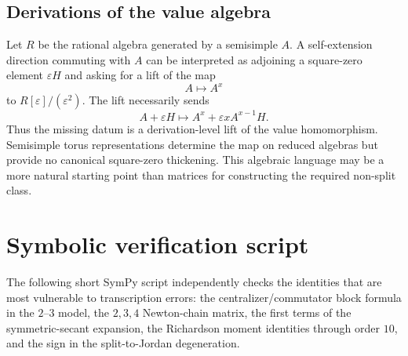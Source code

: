 \documentclass[11pt,oneside]{article}
\theoremstyle{definition}
\theoremstyle{remark}
\begin{document}
\subsection{Derivations of the value algebra}

Let $R$ be the rational algebra generated by a semisimple $A$.  A self-extension direction
commuting with $A$ can be interpreted as adjoining a square-zero element $\varepsilon H$ and
asking for a lift of the map
\[
 A\longmapsto A^x
\]
to $R[\varepsilon]/(\varepsilon^2)$.  The lift necessarily sends
\[
 A+\varepsilon H
 \longmapsto
 A^x+\varepsilon xA^{x-1}H.
\]
Thus the missing datum is a derivation-level lift of the value homomorphism.  Semisimple torus
representations determine the map on reduced algebras but provide no canonical square-zero
thickening.  This algebraic language may be a more natural starting point than matrices for
constructing the required non-split class.

\section{Symbolic verification script}
\label{app:symbolic}

The following short SymPy script independently checks the identities that are most vulnerable
to transcription errors: the centralizer/commutator block formula in the $2$--$3$ model, the
$2,3,4$ Newton-chain matrix, the first terms of the symmetric-secant expansion, the
Richardson moment identities through order $10$, and the sign in the split-to-Jordan
degeneration.
\end{document}
